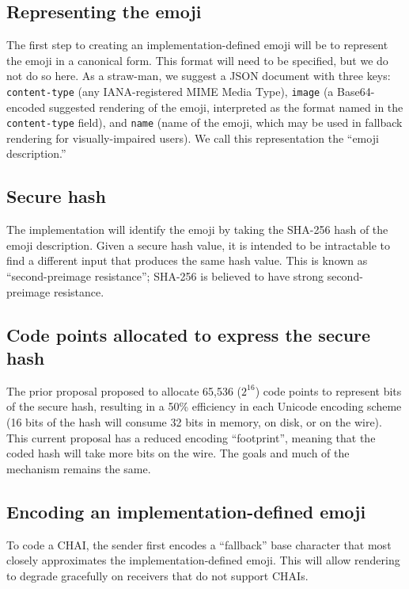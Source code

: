 \documentclass[12pt]{article}
\begin{document}
\subsection{Representing the emoji}

The first step to creating an implementation-defined emoji will be to
represent the emoji in a canonical form. This format will need to be
specified, but we do not do so here. As a straw-man, we suggest a JSON
document with three keys: \texttt{content-type} (any IANA-registered MIME
Media Type), \texttt{image} (a Base64-encoded suggested rendering of the emoji,
interpreted as the format named in the \texttt{content-type} field), and
\texttt{name} (name of the emoji, which may be used in fallback
rendering for visually-impaired users). We call this representation
the ``emoji description.''

\subsection{Secure hash}

The implementation will identify the emoji by taking the SHA-256 hash
of the emoji description. Given a secure hash value, it is intended to be
intractable to find a different input that produces the same
hash value. This is known as ``second-preimage resistance'';
SHA-256 is believed to have strong second-preimage resistance.

\subsection{Code points allocated to express the secure hash}

The prior proposal proposed to allocate 65,536 ($2^{16}$) code points to represent bits
of the secure hash, resulting in a 50\% efficiency in each Unicode encoding scheme (16 bits of
the hash will consume 32 bits in memory, on disk, or on the wire)\autocite{L216105}. This current proposal has a reduced encoding ``footprint'', meaning that the coded hash will take more bits
on the wire. The goals and much of the mechanism remains the same.

\subsection{Encoding an implementation-defined emoji}

To code a CHAI, the sender first encodes a ``fallback'' base character
that most closely approximates the implementation-defined emoji. This
will allow rendering to degrade gracefully on receivers that do not
support CHAIs.
\end{document}
